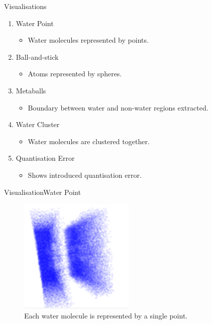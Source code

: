 \documentclass{beamer}
\begin{document}
\begin{frame}{Visualisations}
\begin{enumerate}

  \item Water Point
  \begin{itemize}
    \item Water molecules represented by points.
  \end{itemize}

  \item Ball-and-stick
  \begin{itemize}
    \item Atoms represented by spheres.
  \end{itemize}

  \item Metaballs
  \begin{itemize}
    \item Boundary between water and non-water regions extracted.
  \end{itemize}

  \item Water Cluster
  \begin{itemize}
    \item Water molecules are clustered together.
  \end{itemize}

  \item Quantisation Error
  \begin{itemize}
    \item Shows introduced quantisation error.
  \end{itemize}

\end{enumerate}
\end{frame}

\begin{frame}{Visualisation}{Water Point}
\begin{figure}
  \centering
  \includegraphics[width=55mm]{min-images/water-point.png}
  \caption{Each water molecule is represented by a single point.}
\end{figure}
\end{frame}
\end{document}
